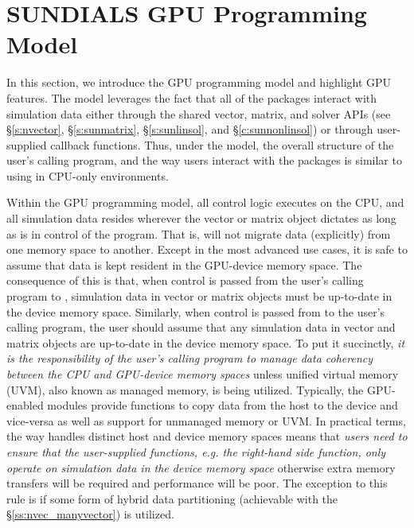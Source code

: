\section{SUNDIALS GPU Programming Model}\label{s:gpu_model}

In this section, we introduce the {\sundials} GPU programming model and
highlight {\sundials} GPU features. The model leverages the fact that all of the
{\sundials} packages interact with simulation data either through the shared
vector, matrix, and solver APIs (see \S\ref{s:nvector}, \S\ref{s:sunmatrix},
\S\ref{s:sunlinsol}, and \S\ref{c:sunnonlinsol}) or through user-supplied
callback functions.  Thus, under the model, the overall structure of the user's
calling program, and the way users interact with the {\sundials} packages is
similar to using {\sundials} in CPU-only environments.

Within the {\sundials} GPU programming model, all control logic executes on the
CPU, and all simulation data resides wherever the vector or matrix object
dictates as long as {\sundials} is in control of the program. That is,
{\sundials} will not migrate data (explicitly) from one memory space to another.
Except in the most advanced use cases, it is safe to assume that data is kept
resident in the GPU-device memory space.  The consequence of this is that, when
control is passed from the user's calling program to {\sundials}, simulation
data in vector or matrix objects must be up-to-date in the device memory space.
Similarly, when control is passed from {\sundials} to the user's calling
program, the user should assume that any simulation data in vector and
matrix objects are up-to-date in the device memory space.  To put it succinctly,
\textit{it is the responsibility of the user's calling program to manage data
coherency between the CPU and GPU-device memory spaces} unless unified virtual
memory (UVM), also known as managed memory, is being utilized. Typically, the
GPU-enabled {\sundials} modules provide functions to copy data from the host to
the device and vice-versa as well as support for unmanaged memory or UVM. In
practical terms, the way {\sundials} handles distinct host and device memory
spaces means that \textit{users need to ensure that the user-supplied functions,
e.g. the right-hand side function, only operate on simulation data in the device
memory space} otherwise extra memory transfers will be required and performance
will be poor.  The exception to this rule is if some form of hybrid data
partitioning (achievable with the {\nvecmanyvector} \S\ref{ss:nvec_manyvector})
is utilized.

